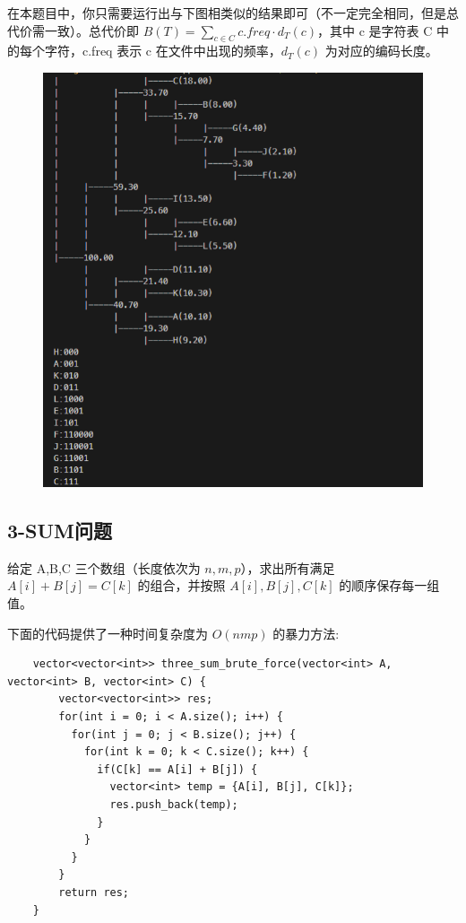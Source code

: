 \documentclass[12pt,a4paper]{article}
\begin{document}
在本题目中，你只需要运行出与下图相类似的结果即可（不一定完全相同，但是总代价需一致）。总代价即 $B(T) = \sum_{c\in C} c.freq \cdot d_T(c)$，其中 c 是字符表 C 中的每个字符，c.freq 表示 c 在文件中出现的频率，$d_T(c)$ 为对应的编码长度。
\begin{figure}[h]
    \centering
    \includegraphics[width=12cm]{img/lab5/lab5.png}
    \label{fig:my_label}
\end{figure}



\subsection{3-SUM问题}

给定 A,B,C 三个数组（长度依次为 $n, m, p$），求出所有满足 $A[i] + B[j] = C[k]$ 的组合，并按照 $A[i], B[j], C[k]$ 的顺序保存每一组值。

下面的代码提供了一种时间复杂度为 $O(nmp)$ 的暴力方法:

\begin{lstlisting}
    vector<vector<int>> three_sum_brute_force(vector<int> A, vector<int> B, vector<int> C) {
        vector<vector<int>> res;
        for(int i = 0; i < A.size(); i++) {
          for(int j = 0; j < B.size(); j++) {
            for(int k = 0; k < C.size(); k++) {
              if(C[k] == A[i] + B[j]) {
                vector<int> temp = {A[i], B[j], C[k]};
                res.push_back(temp);
              }
            }
          }
        }
        return res;
    }
\end{lstlisting}
\end{document}
